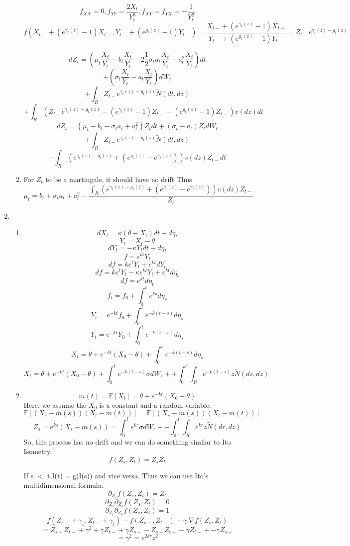\documentclass[a4paper,11pt]{article}
\begin{document}
\begin{enumerate}
\begin{enumerate}
\[ f_{XX}= 0 , f_{YY}  = \frac{2X_t}{Y_t^3}, f_{XY}= f_{YX} = -\frac{1}{Y_t^2} \]
\[f(X_{t-}+(e^{\gamma_t(z)}-1)X_{t-},Y_{t-}+(e^{g_t(z)}-1)Y_{t-}) = \frac{X_{t-}+(e^{\gamma_t(z)}-1)X_{t-}}{Y_{t-}+(e^{g_t(z)}-1)Y_{t-}} = Z_{t-} e^{\gamma_t(z)-g_t(z)} \]

\[dZ_t = (\mu_t \frac{X_t}{Y_t} -b_t \frac{X_t}{Y_t} -2\frac{1}{2} \sigma_t a_t \frac{X_t}{Y_t}+ a_t^2 \frac{X_t}{Y_t} )dt\]
\[+ (\sigma_t\frac{X_t}{Y_t} - a_t\frac{X_t}{Y_t})dW_t\]
\[+\int_R Z_{t-} e^{\gamma_t(z)-g_t(z)} \widetilde{N}(dt,dz) \]
\[+\int_R (Z_{t-} e^{\gamma_t(z)-g_t(z)} - (e^{\gamma_t(z)}-1) Z_{t-}+ (e^{g_t(z)}-1) Z_{t-})v(dz)dt \]
 \[dZ_t = (\mu_t -b_t  -\sigma_t a_t +a_t^2 )Z_t dt+ (\sigma_t - a_t)Z_tdW_t\]
\[+\int_R Z_{t-} e^{\gamma_t(z)-g_t(z)} \widetilde{N}(dt,dz) \]
\[+\int_R ( e^{\gamma_t(z)-g_t(z)} +(e^{g_t(z)}-e^{\gamma_t(z)}) )v(dz)Z_{t-}dt \]
\item 
For $Z_t$ to be a martingale, it should have no drift
Thus
\[\mu_t = b_t  +\sigma_t a_t + a_t^2- \frac{\int_R ( e^{\gamma_t(z)-g_t(z)} +(e^{g_t(z)}-e^{\gamma_t(z)}) )v(dz)Z_{t-}}{Z_t}\]
\end{enumerate}
\item 
\begin{enumerate}
 \item \[dX_t = \kappa (\theta -X_t)dt + d\eta_t\]
\[Y_t = X_t - \theta\]
\[dY_t = -\kappa Y_t dt + d\eta_t\]
\[f = e^{kt} Y_t\]
\[df = ke^{t} Y_t +e^{kt}dY_t\]
\[df= ke^{t} Y_t -\kappa e^{kt}Y_t + e^{kt}d\eta_t\]
\[df =  e^{kt}d\eta_t\]
\[f_t = f_0 +\int_0^t e^{ks}d\eta_s\]
\[Y_t = e^{-kt}f_0 +\int_0^t e^{-k(t-s)}d\eta_s\]
\[Y_t = e^{-kt}Y_0 +\int_0^t e^{-k(t-s)}d\eta_s\]
\[X_t = \theta + e^{-kt}(X_0 - \theta) +\int_0^t e^{-k(t-s)}d\eta_s\]
\[X_t = \theta + e^{-kt}(X_0 - \theta) +\int_0^t e^{-k(t-s)}\sigma dW_s+ +\int_0^t \int_R e^{-k(t-s)}z \widetilde{N}(ds,dz)\]
\item 
\[m(t) = \mathbb{E}[X_t] = \theta + e^{-kt}(X_0 - \theta) \]
Here, we assume the $X_0$ is a constant and a random variable. 
\[\mathbb{E}[(X_s -m(s))(X_t-m(t))] = \mathbb{E}[(X_s -m(s))(X_t-m(t))]\]
\[Z_s =e^{ks}(X_s -m(s)) =  \int_0^t e^{kr}\sigma dW_r+ +\int_0^t \int_R e^{kr}z \widetilde{N}(dr,dz) \]
 So, this process has no drift and we can do something similar to Ito Isometry.
 \[f(Z_s,Z_t)= Z_sZ_t\]
 
 If s $<$ t,I(t) = g(I(s)) and vice versa. Thus we can use Ito's multidimensional formula.  
  \[\partial_{Z_s}f(Z_s,Z_t)=Z_t\]
  \[\partial_{Z_s}\partial_{Z_s}f(Z_s,Z_t)=0\]
   \[\partial_{Z_t}\partial_{Z_s}f(Z_s,Z_t)=1\]
 \[f(Z_{s-}+\gamma_s,Z_{t-}+\gamma_t)-f(Z_{s-},Z_{t-}) - \gamma. \nabla f(Z_s,Z_t) \]
 \[=  Z_{s-}Z_{t-}+ \gamma^2+\gamma Z_{t-}+ \gamma Z_{s-} -Z_{s-}Z_{t-}- \gamma Z_{t-}+-\gamma Z_{s-}\]
 \[=\gamma^2= e^{2kr}z^2\]


\end{enumerate}
\end{enumerate}
\end{document}
